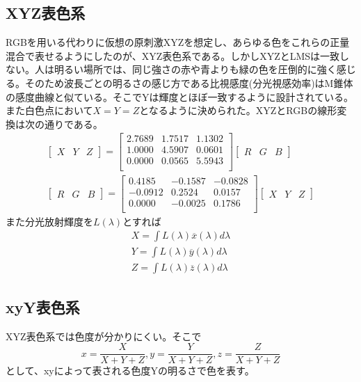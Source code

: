 \documentclass{jsarticle}
\begin{document}
		\subsection{XYZ表色系}
			RGBを用いる代わりに仮想の原刺激XYZを想定し、あらゆる色をこれらの正量混合で表せるようにしたのが、XYZ表色系である。しかしXYZとLMSは一致しない。人は明るい場所では、同じ強さの赤や青よりも緑の色を圧倒的に強く感じる。そのため波長ごとの明るさの感じ方である比視感度(分光視感効率)はM錐体の感度曲線と似ている。そこでYは輝度とほぼ一致するように設計されている。また白色点において$X = Y = Z$となるように決められた。XYZとRGBの線形変換は次の通りである。
			\begin{align*}
				\begin{bmatrix} X & Y & Z \end{bmatrix}
				=
				\begin{bmatrix}
					2.7689 & 1.7517 & 1.1302 \\
					1.0000 & 4.5907 & 0.0601 \\
					0.0000 & 0.0565 & 5.5943 \\
				\end{bmatrix}
				\begin{bmatrix} R & G & B \end{bmatrix}\\
				\begin{bmatrix} R & G & B \end{bmatrix}
				=
				\begin{bmatrix}
					0.4185 & -0.1587 & -0.0828 \\
					-0.0912 & 0.2524 & 0.0157 \\
					0.0000 & -0.0025 & 0.1786 \\
				\end{bmatrix}
				\begin{bmatrix} X & Y & Z \end{bmatrix}
			\end{align*}
			また分光放射輝度を$L(\lambda)$とすれば
			\begin{align*}
				X = \int L(\lambda)\overline{x}(\lambda)d\lambda\\
				Y = \int L(\lambda)\overline{y}(\lambda)d\lambda\\
				Z = \int L(\lambda)\overline{z}(\lambda)d\lambda
			\end{align*}
		\subsection{xyY表色系}
			XYZ表色系では色度が分かりにくい。そこで
				\[x = \frac{X}{X + Y + Z}, y = \frac{Y}{X + Y + Z}, z = \frac{Z}{X + Y + Z}\]
			として、xyによって表される色度Yの明るさで色を表す。
\end{document}
